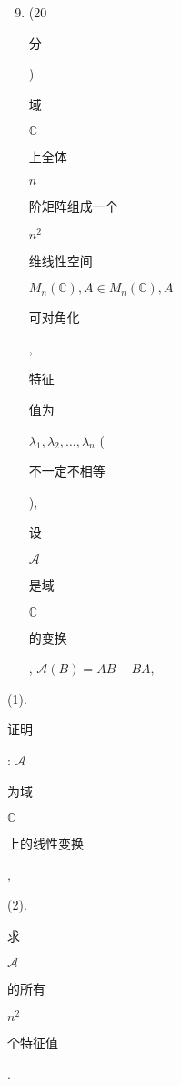 \documentclass[10pt]{article}
\begin{document}
\begin{enumerate}
  \setcounter{enumi}{8}
  \item (20 \begin{CJK}{UTF8}{mj}分\end{CJK}) \begin{CJK}{UTF8}{mj}域\end{CJK} $\mathbb{C}$ \begin{CJK}{UTF8}{mj}上全体\end{CJK} $n$ \begin{CJK}{UTF8}{mj}阶矩阵组成一个\end{CJK} $n^{2}$ \begin{CJK}{UTF8}{mj}维线性空间\end{CJK} $M_{n}(\mathbb{C}), A \in M_{n}(\mathbb{C}), A$ \begin{CJK}{UTF8}{mj}可对角化\end{CJK}, \begin{CJK}{UTF8}{mj}特征\end{CJK} \begin{CJK}{UTF8}{mj}值为\end{CJK} $\lambda_{1}, \lambda_{2}, \ldots, \lambda_{n}$ (\begin{CJK}{UTF8}{mj}不一定不相等\end{CJK}), \begin{CJK}{UTF8}{mj}设\end{CJK} $\mathscr{A}$ \begin{CJK}{UTF8}{mj}是域\end{CJK} $\mathbb{C}$ \begin{CJK}{UTF8}{mj}的变换\end{CJK}, $\mathscr{A}(B)=A B-B A$,
\end{enumerate}
(1). \begin{CJK}{UTF8}{mj}证明\end{CJK}: $\mathscr{A}$ \begin{CJK}{UTF8}{mj}为域\end{CJK} $\mathbb{C}$ \begin{CJK}{UTF8}{mj}上的线性变换\end{CJK},

(2). \begin{CJK}{UTF8}{mj}求\end{CJK} $\mathscr{A}$ \begin{CJK}{UTF8}{mj}的所有\end{CJK} $n^{2}$ \begin{CJK}{UTF8}{mj}个特征值\end{CJK}.
\end{document}
